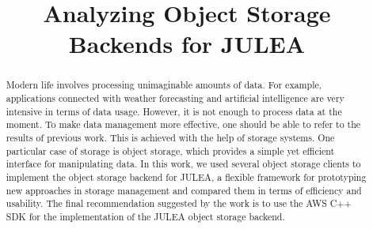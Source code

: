 \documentclass[conference]{IEEEtran}
\begin{document}
\title{Analyzing Object Storage Backends for JULEA}

\author{
\and
{}
\and
{}
}

\maketitle

\begin{abstract}
Modern life involves processing unimaginable amounts of data. For example, applications connected with weather forecasting and artificial intelligence are very intensive in terms of data usage. However, it is not enough to process data at the moment. To make data management more effective, one should be able to refer to the results of previous work. This is achieved with the help of storage systems. One particular case of storage is object storage, which provides a simple yet efficient interface for manipulating data. In this work, we used several object storage clients to implement the object storage backend for JULEA, a flexible framework for prototyping new approaches in storage management and compared them in terms of efficiency and usability. The final recommendation suggested by the work is to use the AWS C++ SDK for the implementation of the JULEA object storage backend.
\end{abstract}
\end{document}
